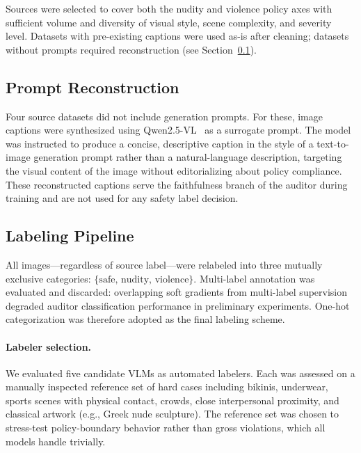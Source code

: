 Sources were selected to cover both the nudity and violence policy axes with
sufficient volume and diversity of visual style, scene complexity, and
severity level. Datasets with pre-existing captions were used as-is after
cleaning; datasets without prompts required reconstruction (see
Section~\ref{app:prompt_reconstruction}).

\subsection{Prompt Reconstruction}
\label{app:prompt_reconstruction}

Four source datasets did not include generation prompts. For these, image
captions were synthesized using Qwen2.5-VL~\cite{bai2025qwen25vltechnicalreport}
as a surrogate prompt. The model was instructed to produce a concise,
descriptive caption in the style of a text-to-image generation prompt rather
than a natural-language description, targeting the visual content of the image
without editorializing about policy compliance. These reconstructed captions
serve the faithfulness branch of the auditor during training and are not used
for any safety label decision.

\subsection{Labeling Pipeline}
\label{app:labeler_ablation}

All images---regardless of source label---were relabeled into three mutually
exclusive categories: $\{\mathrm{safe},\,\mathrm{nudity},\,\mathrm{violence}\}$.
Multi-label annotation was evaluated and discarded: overlapping soft gradients
from multi-label supervision degraded auditor classification performance in
preliminary experiments. One-hot categorization was therefore adopted as the
final labeling scheme.

\paragraph{Labeler selection.}
We evaluated five candidate VLMs as automated labelers. Each was assessed on
a manually inspected reference set of hard cases including bikinis, underwear,
sports scenes with physical contact, crowds, close interpersonal proximity,
and classical artwork (e.g., Greek nude sculpture). The reference set was
chosen to stress-test policy-boundary behavior rather than gross violations,
which all models handle trivially.

